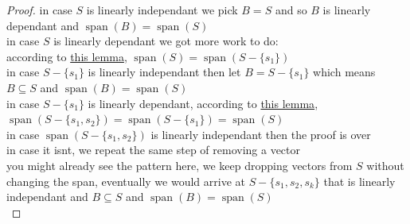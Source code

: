 \documentclass[a4paper,12pt]{article}
\DeclareMathOperator{\spn}{span}
\begin{document}
\begin{definition}
\begin{lemma}
\begin{proof}
in case \(S\) is linearly independant we pick \(B = S\) and so \(B\) is linearly dependant and \(\spn(B) = \spn(S)\)\\
in case \(S\) is linearly dependant we got more work to do:\\
according to \hyperref[orgd3163b2]{this lemma}, \(\spn(S) = \spn(S - \{s_1\})\)\\
in case \(S - \{s_1\}\) is linearly independant then let \(B = S - \{s_1\}\) which means \(B \subseteq S\) and \(\spn(B) = \spn(S)\)\\
in case \(S - \{s_1\}\) is linearly dependant, according to \hyperref[orgd3163b2]{this lemma}, \(\spn(S - \{s_1,s_2\}) = \spn(S - \{s_1\}) = \spn(S)\)\\
in case \(\spn(S - \{s_1,s_2\})\) is linearly independant then the proof is over\\
in case it isnt, we repeat the same step of removing a vector\\
you might already see the pattern here, we keep dropping vectors from \(S\) without changing the span, eventually we would arrive at \(S - \{s_1,s_2,s_k\}\) that is linearly independant and \(B \subseteq S\) and \(\spn(B) = \spn(S)\)\\
\end{proof}
\end{lemma}
\end{definition}
\end{document}

